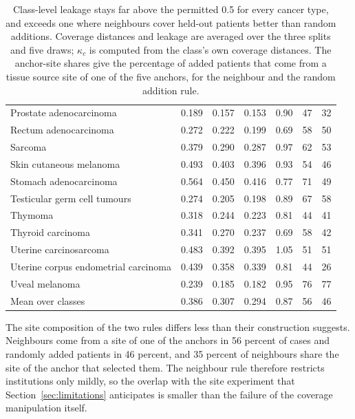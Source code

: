 \begin{table}[htbp]
\begin{tabular}{@{}lrrrrrr@{}}
Prostate adenocarcinoma & 0.189 & 0.157 & 0.153 & 0.90 & 47 & 32 \\
Rectum adenocarcinoma & 0.272 & 0.222 & 0.199 & 0.69 & 58 & 50 \\
Sarcoma & 0.379 & 0.290 & 0.287 & 0.97 & 62 & 53 \\
Skin cutaneous melanoma & 0.493 & 0.403 & 0.396 & 0.93 & 54 & 46 \\
Stomach adenocarcinoma & 0.564 & 0.450 & 0.416 & 0.77 & 71 & 49 \\
Testicular germ cell tumours & 0.274 & 0.205 & 0.198 & 0.89 & 67 & 58 \\
Thymoma & 0.318 & 0.244 & 0.223 & 0.81 & 44 & 41 \\
Thyroid carcinoma & 0.341 & 0.270 & 0.237 & 0.69 & 58 & 42 \\
Uterine carcinosarcoma & 0.483 & 0.392 & 0.395 & 1.05 & 51 & 51 \\
Uterine corpus endometrial carcinoma & 0.439 & 0.358 & 0.339 & 0.81 & 44 & 26 \\
Uveal melanoma & 0.239 & 0.185 & 0.182 & 0.95 & 76 & 77 \\
\midrule
Mean over classes & 0.386 & 0.307 & 0.294 & 0.87 & 56 & 46 \\
\bottomrule
\end{tabular}
\caption{Class-level leakage stays far above the permitted 0.5 for every cancer type, and exceeds one where neighbours cover held-out patients better than random additions. Coverage distances and leakage are averaged over the three splits and five draws; $\kappa_c$ is computed from the class's own coverage distances. The anchor-site shares give the percentage of added patients that come from a tissue source site of one of the five anchors, for the neighbour and the random addition rule.}
\label{tab:class-census}
\end{table}

\noindent The site composition of the two rules differs less than their construction suggests. Neighbours come from a site of one of the anchors in 56 percent of cases and randomly added patients in 46 percent, and 35 percent of neighbours share the site of the anchor that selected them. The neighbour rule therefore restricts institutions only mildly, so the overlap with the site experiment that Section~\ref{sec:limitations} anticipates is smaller than the failure of the coverage manipulation itself.

